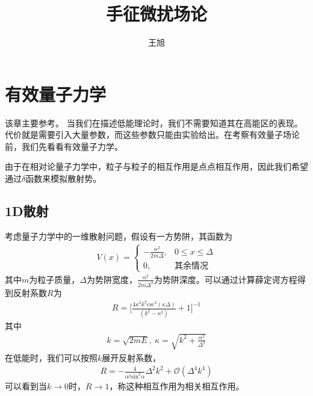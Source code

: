 \documentclass[aps,tightenlines,16pt]{ctexart}
\numberwithin{equation}{section}
\begin{document}
\large
     \title{手征微扰场论}
     
\renewcommand{\today}{\number\year 年 \number\month 月 \number\day 日}
 \author{王旭}
 \maketitle
 \setlength{\parindent}{2em}  %
 \hypersetup{hypertex=true,
            colorlinks=true,
            linkcolor=blue,
            anchorcolor=blue,
            citecolor=blue}  %
 \renewcommand\thesubsection{\arabic {subsection}}
 \renewcommand\contentsname{目录}
\tableofcontents
\newpage 

\section{有效量子力学}
该章主要参考\cite{kaplan2016lectures}。
当我们在描述低能理论时，我们不需要知道其在高能区的表现。代价就是需要引入大量参数，而这些参数只能由实验给出。在考察有效量子场论前，我们先看看有效量子力学。

由于在相对论量子力学中，粒子与粒子的相互作用是点点相互作用，因此我们希望通过$\delta$函数来模拟散射势。
\subsection{1D散射}
考虑量子力学中的一维散射问题，假设有一方势阱，其函数为
\begin{align}
   V(x)=
   \begin{cases}
      -\frac{\alpha^2}{2m\Delta}, & 0\leq x \leq \Delta \\
      0 ,& \mbox{其余情况}
   \end{cases}   
\end{align}
其中$m$为粒子质量，$\Delta$为势阱宽度，$\frac{\alpha^2}{2m\Delta^2}$为势阱深度。可以通过计算薛定谔方程得到反射系数$R$为
\begin{align}
   R=\Big[\frac{4\kappa^2 k^2 \mbox{csc}^2(\kappa \Delta)}{(k^2-\kappa^2)}+1\Big]^{-1}
\end{align}
其中
\begin{align}
   k=\sqrt{2mE},\   \kappa=\sqrt{k^2+\frac{\alpha^2}{\Delta^2}}
\end{align}
在低能时，我们可以按照$k$展开反射系数，
\begin{align}\label{1d_R}
   R= -\frac{4}{\alpha^2 \mbox{sin}^2\alpha}\Delta^2 k^2 + \mathcal{O}(\Delta^4 k^4)
\end{align}
可以看到当$k \to 0$时，$R \to 1$，称这种相互作用为相关相互作用。
\end{document}
